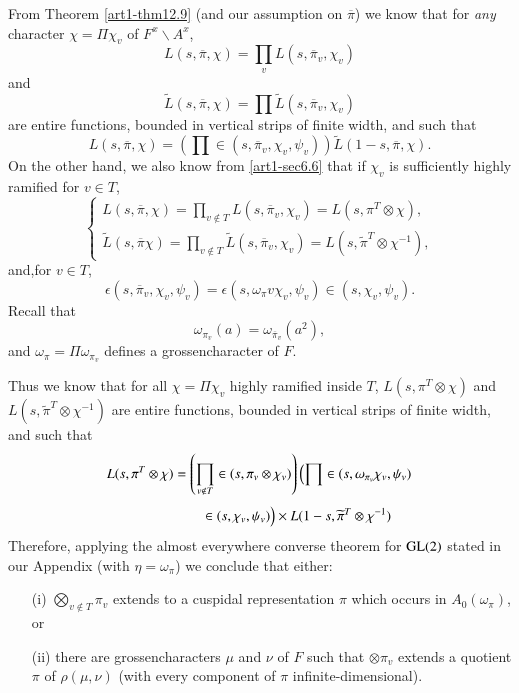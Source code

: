 From Theorem \ref{art1-thm12.9} (and our assumption on $\overline{\pi}$) we know that for {\em any} character $\chi=\Pi \chi_{v}$ of $F^{x}\backslash A^{x}$,
$$
L(s,\overline{\pi},\chi)=\prod\limits_{v}L(s,\overline{\pi}_{v},\chi_{v})
$$
and
$$
\widetilde{L}(s,\overline{\pi},\chi)=\prod \widetilde{L}(s,\overline{\pi}_{v},\chi_{v})
$$
are entire functions, bounded in vertical strips of finite width, and such that
\begin{equation}
L(s,\overline{\pi},\chi)=\left(\prod\in (s,\overline{\pi}_{v},\chi_{v},\psi_{v})\right)\widetilde{L}(1-s,\overline{\pi},\chi).\label{art1-eq15.3.4}
\end{equation}
On the other hand, we also know from \ref{art1-sec6.6} that if $\chi_{v}$ is sufficiently highly ramified for $v\in T$,
$$
\begin{cases}
L(s,\overline{\pi},\chi)=\prod\limits_{v\not\in T}L(s,\overline{\pi}_{v},\chi_{v})=L(s,\pi^{T}\otimes \chi),\\[4pt]
\widetilde{L}(s,\overline{\pi}\chi)=\prod\limits_{v\not\in T}\widetilde{L}(s,\overline{\pi}_{v},\chi_{v})=L(s,\widetilde{\pi}^{T}\otimes \chi^{-1}),
\end{cases}
$$
and,\pageoriginale for $v\in T$,
$$
\epsilon(s,\overline{\pi}_{v},\chi_{v},\psi_{v})=\epsilon(s,\omega_{\pi}v\chi_{v},\psi_{v})\in (s,\chi_{v},\psi_{v}).
$$
Recall that
\begin{equation}
\omega_{\pi_{v}}(a)=\omega_{\overline{\pi}_{v}}(a^{2}),\label{art1-eq15.3.5}
\end{equation}
and $\omega_{\pi}=\Pi \omega_{\pi_{v}}$ defines a grossencharacter of $F$.

Thus we know that for all $\chi=\Pi \chi_{v}$ highly ramified inside $T$, $L(s,\pi^{T}\otimes\chi)$ and $L(s,\widetilde{\pi}^{T}\otimes \chi^{-1})$ are entire functions, bounded in vertical strips of finite width, and such that
\begin{align}
L(s,\pi^{T}\otimes \chi) &= \left(\prod\limits_{v\not\in T}\in (s,\pi_{v}\otimes \chi_{v})\right)\left(\prod \in (s,\omega_{\pi_{v}}\chi_{v},\psi_{v})\right.\label{art1-eq15.3.6}\\[3pt]
&\qquad \in (s,\chi_{v},\psi_{v})\Big)\times L(1-s,\widetilde{\pi}^{T}\otimes \chi^{-1})\notag
\end{align}
Therefore, applying the almost everywhere converse theorem for $\mathrm{GL}(2)$ stated in our Appendix (with $\eta=\omega_{\pi}$) we conclude that either:
\begin{itemize}
\item[(i)] $\bigotimes\limits_{v\not\in T}\pi_{v}$ extends to a cuspidal representation $\pi$ which occurs in $A_{0}(\omega_{\pi})$, or

\item[(ii)] there are grossencharacters $\mu$ and $\nu$ of $F$ such that $\otimes \pi_{v}$ extends a quotient $\pi$ of $\rho(\mu,\nu)$ (with every component of $\pi$ infinite-dimen\-sional).
\end{itemize}

